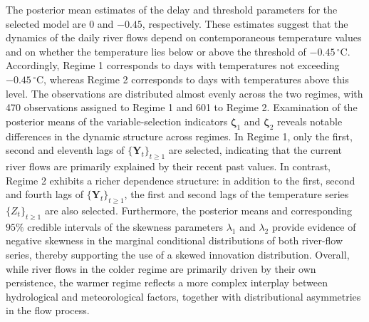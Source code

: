 The posterior mean estimates of the delay and threshold parameters for the selected model are $0$ and $-0.45$, respectively. These estimates suggest that the dynamics of the daily river flows depend on contemporaneous temperature values and on whether the temperature lies below or above the threshold of $-0.45 \,^{\circ}\text{C}$. Accordingly, Regime 1 corresponds to days with temperatures not exceeding $-0.45\,^{\circ}\text{C}$, whereas Regime 2 corresponds to days with temperatures above this level. The observations are distributed almost evenly across the two regimes, with 470 observations assigned to Regime 1 and 601 to Regime 2. Examination of the posterior means of the variable-selection indicators $\bm{\zeta}_1$ and $\bm{\zeta}_2$ reveals notable differences in the dynamic structure across regimes. In Regime 1, only the first, second and eleventh lags of $\{\bm{Y}_t\}_{t\geq 1}$ are selected, indicating that the current river flows are primarily explained by their recent past values. In contrast, Regime 2 exhibits a richer dependence structure: in addition to the first, second and fourth lags of $\{\bm{Y}_t\}_{t\geq 1}$, the first and second lags of the temperature series $\{Z_t\}_{t\geq 1}$ are also selected. Furthermore, the posterior means and corresponding $95\%$ credible intervals of the skewness parameters $\lambda_1$ and $\lambda_2$ provide evidence of negative skewness in the marginal conditional distributions of both river-flow series, thereby supporting the use of a skewed innovation distribution. Overall, while river flows in the colder regime are primarily driven by their own persistence, the warmer regime reflects a more complex interplay between hydrological and meteorological factors, together with distributional asymmetries in the flow process.

